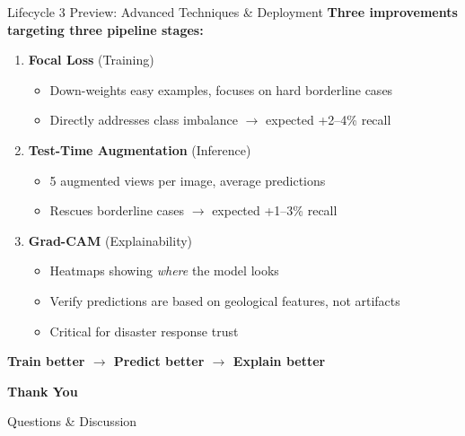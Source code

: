 \documentclass[aspectratio=169]{beamer}
\begin{document}
\begin{frame}{Lifecycle 3 Preview: Advanced Techniques \& Deployment}
    \textbf{Three improvements targeting three pipeline stages:}

    \vspace{0.3cm}
    \begin{enumerate}
        \item \textbf{Focal Loss} (Training)
            \begin{itemize}
                \item Down-weights easy examples, focuses on hard borderline cases
                \item Directly addresses class imbalance $\to$ expected +2--4\% recall
            \end{itemize}

        \item \textbf{Test-Time Augmentation} (Inference)
            \begin{itemize}
                \item 5 augmented views per image, average predictions
                \item Rescues borderline cases $\to$ expected +1--3\% recall
            \end{itemize}

        \item \textbf{Grad-CAM} (Explainability)
            \begin{itemize}
                \item Heatmaps showing \textit{where} the model looks
                \item Verify predictions are based on geological features, not artifacts
                \item Critical for disaster response trust
            \end{itemize}
    \end{enumerate}

    \vspace{0.2cm}
    \centering
    \textbf{Train better $\to$ Predict better $\to$ Explain better}
\end{frame}

\begin{frame}{}
    \centering
    \vspace{2cm}
    {\Large \textbf{Thank You}}

    \vspace{1cm}
    Questions \& Discussion
\end{frame}
\end{document}
